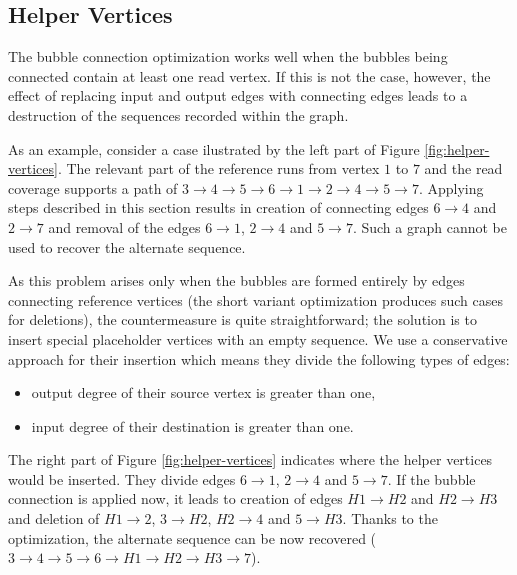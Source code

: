 \subsection{Helper Vertices}
\label{subsec:helper-vertices}

The bubble connection optimization works well when the bubbles being connected contain at least one read vertex. If this is not the case, however, the effect of replacing input and output edges with connecting edges leads to a destruction of the sequences recorded within the graph.

As an example, consider a case ilustrated by the left part of Figure \ref{fig:helper-vertices}. The relevant part of the reference runs from vertex $1$ to $7$ and the read coverage supports a path of $3 \to 4 \to 5 \to 6 \to 1 \to 2 \to 4 \to 5 \to 7$. Applying steps described in this section results  in creation of connecting edges $6 \to 4$ and $2 \to 7$ and removal of the edges $6 \to 1$, $2 \to 4$ and $5 \to 7$. Such a graph cannot be used to recover the alternate sequence.

As this problem arises only when the bubbles are formed entirely by edges connecting reference vertices (the short variant optimization produces such cases for deletions), the countermeasure is quite straightforward; the solution is to  insert special placeholder vertices with an empty sequence. We use a conservative approach for their insertion which means they divide the following types of edges:
\begin{itemize}
\item output degree of their source vertex is greater than one,
\item input degree of their destination is greater than one.
\end{itemize}
The right part of Figure \ref{fig:helper-vertices} indicates where the helper vertices would be inserted. They divide edges $6 \to 1$, $2 \to 4$ and $5 \to 7$. If the bubble connection is applied now, it leads to creation of edges $H1 \to H2$ and $H2 \to H3$ and deletion of $H1 \to 2$, $3 \to H2$, $H2 \to 4$ and $5 \to H3$. Thanks to the optimization, the alternate sequence can be now recovered ($3 \to 4 \to 5 \to 6 \to H1 \to H2 \to H3 \to 7$).

